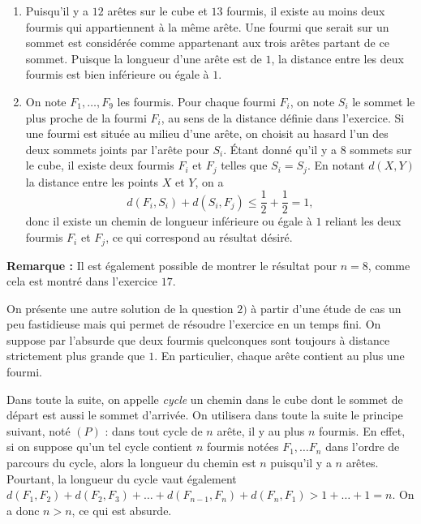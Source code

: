 \begin{enumerate}
\item Puisqu'il y a $12$ arêtes sur le cube et $13$ fourmis, il existe au moins deux fourmis qui appartiennent à la même arête.
Une fourmi que serait sur un sommet est considérée comme appartenant aux trois arêtes partant de ce sommet. Puisque la longueur d'une arête est de $1$, la distance entre les deux fourmis est bien inférieure ou égale à $1$.

\item On note $F_1, \ldots , F_9$ les fourmis. Pour chaque fourmi $F_i$, on note $S_i$ le sommet le plus proche
de la fourmi $F_i$, au sens de la distance définie dans l'exercice. Si une fourmi est située au milieu d'une arête, on choisit au hasard l'un des deux sommets joints par l'arête pour $S_i$. Étant donné qu'il y a $8$ sommets sur le cube, il existe deux fourmis $F_i$ et $F_j$ telles que $S_i=S_j$. En notant $d(X,Y)$ la distance entre les points $X$ et $Y$, on a
$$d(F_i,S_i)+d(S_i,F_j)\le \frac{1}{2}+\frac{1}{2}=1,$$
donc il existe un chemin de longueur inférieure ou égale à $1$ reliant les deux fourmis $F_i$ et $F_j$, ce qui correspond au résultat désiré.
\end{enumerate}

\textbf{Remarque :} Il est également possible de montrer le résultat pour $n=8$, comme cela est montré dans l'exercice $17$.


\altsol

On présente une autre solution de la question $2)$ à partir d'une étude de cas un peu fastidieuse mais qui permet de résoudre l'exercice en un temps fini. On suppose par l'absurde que deux fourmis quelconques sont toujours à distance strictement plus grande que $1$. En particulier, chaque arête contient au plus une fourmi.

\medskip

Dans toute la suite, on appelle \textit{cycle} un chemin dans le cube dont le sommet de départ est aussi le sommet d'arrivée. On utilisera dans toute la suite le principe suivant, noté $(P)$ : dans tout cycle de $n$ arête, il y au plus $n$ fourmis. En effet, si on suppose qu'un tel cycle contient $n$ fourmis notées $F_1, \ldots F_n$ dans l'ordre de parcours du cycle, alors la longueur du chemin est $n$ puisqu'il y a $n$ arêtes. Pourtant, la longueur du cycle vaut également $d(F_1, F_2)+d(F_2,F_3)+\ldots +d(F_{n-1}, F_n)+d(F_n,F_1) > 1+\ldots + 1 = n$. On a donc $n>n$, ce qui est absurde.

\medskip

